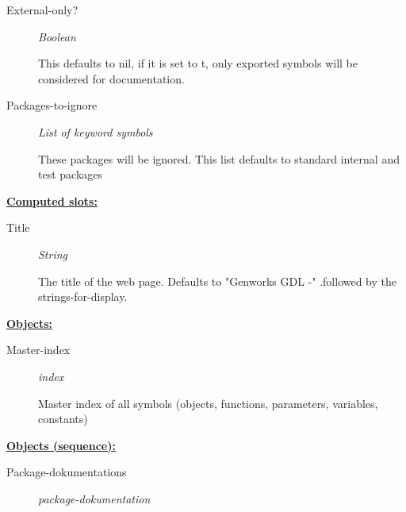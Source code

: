 \documentclass [11pt]{book}
\begin{document}
\begin{itemize}
\begin{description}

\item [External-only?]
\emph{Boolean}

 This defaults to nil, if it is set to t, only exported symbols will be
considered for documentation.




\item [Packages-to-ignore]
\emph{List of keyword symbols}

 These packages will be ignored.
This list defaults to standard internal and test packages




\end{description}






\textbf{
\underline{Computed slots:}}

\begin{description}

\item [Title]
\emph{String}

 The title of the web page. Defaults to "Genworks GDL -"
.followed by the strings-for-display.




\end{description}






\textbf{
\underline{Objects:}}

\begin{description}

\item [Master-index]
\emph{index}

 Master index of all symbols (objects, functions, parameters, variables, constants)




\end{description}






\textbf{
\underline{Objects (sequence):}}

\begin{description}

\item [Package-dokumentations]
\emph{package-dokumentation}


\end{description}
\end{itemize}
\end{document}

